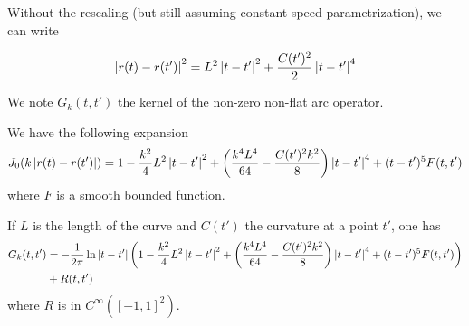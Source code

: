 \documentclass[]{article}
\begin{document}
Without the rescaling (but still assuming constant speed parametrization), we can write 

\[\left\lvert r(t) - r(t') \right\rvert^2 = L^2\left\lvert t-t' \right\rvert^2 + \frac{C(t')^2}{2}\left\lvert t-t' \right\rvert^4\]


We note $G_k(t,t')$ the kernel of the non-zero non-flat arc operator. 

\begin{Lem}
	We have the following expansion
	\[J_0(k\left\lvert r(t) - r(t') \right\rvert) = 1 - \frac{k^2}{4}L^2\left\lvert t-t' \right\rvert^2 + \left(\frac{k^4L^4}{64} -\frac{C(t')^2k^2}{8}\right)\left\lvert t-t' \right\rvert^4 + (t-t')^5 F(t,t')\]
	where $F$ is a smooth bounded function. 
\end{Lem}

\begin{Lem} If $L$ is the length of the curve and $C(t')$ the curvature at a point $t'$, one has
	\begin{align*}G_k(t,t') &= -\frac{1}{2\pi} \ln|t-t'|\left(1 - \frac{k^2}{4}L^2\left\lvert t-t' \right\rvert^2 + \left(\frac{k^4L^4}{64} -\frac{C(t')^2k^2}{8}\right)\left\lvert t-t' \right\rvert^4 + (t-t')^5 F(t,t')\right)\\
	 &+ R(t,t')
	 \end{align*}
	 where $R$ is in $C^{\infty}([-1,1]^2)$.
\end{Lem}
\end{document}
